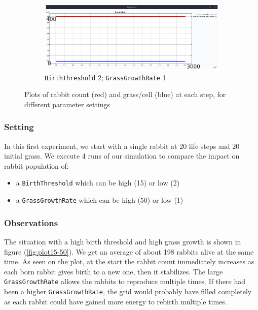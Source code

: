 \documentclass[11pt]{article}
\begin{document}
\begin{figure}[h!]
\begin{subfigure}{.5\textwidth}
        \label{fig:plot2-50}
    \end{subfigure}
    \hfill
    \begin{subfigure}{.5\textwidth}
        \centering
        \includegraphics[width=.95\linewidth]{intro_rabbits/plot2_1.png}
        \caption{\texttt{BirthThreshold} 2; \texttt{GrassGrowthRate} 1}
        \label{fig:plot2-1}
    \end{subfigure}%
    \caption{Plots of rabbit count (red) and grass/cell (blue) at each step, for different parameter settings}
    \label{fig:exp1}
\end{figure}

\subsubsection{Setting}
In this first experiment, we start with a single rabbit at 20 life steps and 20 initial grass.  We execute 4 runs of our simulation to compare the impact on rabbit population of:
\begin{itemize}[nosep]
    \item a \texttt{BirthThreshold} which can be high (15) or low (2)
    \item a \texttt{GrassGrowthRate} which can be high (50) or low (1)
\end{itemize}

\subsubsection{Observations}

The situation with a high birth threshold and high grass growth is shown in figure (\ref{fig:plot15-50}). We get an average of about 198 rabbits alive at the same time. As seen on the plot, at the start the rabbit count immediately increases as each born rabbit gives birth to a new one, then it stabilizes. The large \texttt{GrassGrowthRate} allows the rabbits to reproduce multiple times. If there had been a higher \texttt{GrassGrowthRate}, the grid would probably have filled completely as each rabbit could have gained more energy to rebirth multiple times.
\end{document}
